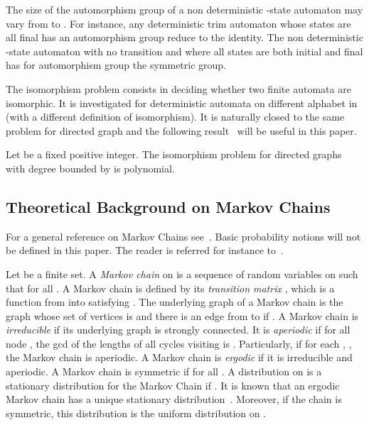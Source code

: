 The size of the automorphism group of a non deterministic -state
automaton may vary from  to . For instance, any deterministic trim
automaton whose states are all final has an  automorphism group reduce to
the identity. The non deterministic -state automaton with no transition
and where all states are both initial and final has for automorphism group
the symmetric group. 

The isomorphism problem consists in deciding whether two finite automata are
isomorphic. It is investigated for deterministic automata on different alphabet
in~\cite{DBLP:journals/siamcomp/Booth78} (with a different definition of
isomorphism). It is naturally closed to the same problem for directed graph
and the following result~\cite{DBLP:journals/jcss/Luks82} will be useful in
this paper.
\begin{theorem}\label{thm:luks}
Let  be a fixed positive integer. The isomorphism problem for directed
graphs with degree bounded by  is polynomial.
\end{theorem}

\subsection{Theoretical Background on Markov Chains}\label{sec:theoryMC}

For a general reference on Markov Chains see~\cite{mixing}. Basic
probability notions will not be defined in this paper. The reader is
referred for instance to~\cite{proba-and-computing}.

Let  be a finite set. A {\it Markov chain} on  is a sequence
 of random variables on  such that
 for all . A Markov
chain is defined by its {\it transition matrix} , which is a function
from  into  satisfying . The underlying graph of a Markov chain is the graph whose set of
vertices is  and there is an edge from  to  if .
A Markov chain is {\it irreducible} if its underlying graph is strongly
connected. It is {\it aperiodic} if for all node , the gcd of the lengths
of all cycles visiting  is . Particularly, if for each , , the Markov chain is aperiodic. A Markov chain is {\it ergodic} if it is
irreducible and aperiodic. A Markov chain is symmetric if 
for all . A distribution  on  is a stationary
distribution for the Markov Chain if . It is known that an
ergodic Markov chain has a unique stationary
distribution~\cite[Chapter~1]{mixing}. Moreover, if the chain is symmetric,
this distribution is the uniform distribution on .

